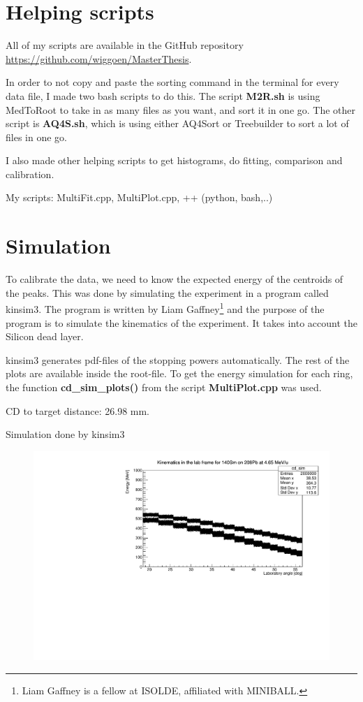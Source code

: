 \documentclass[twoside,english]{uiofysmaster/uiofysmaster}
\begin{document}
\section{Helping scripts}
All of my scripts are available in the GitHub repository \url{https://github.com/wiggoen/MasterThesis}.

In order to not copy and paste the sorting command in the terminal for every data file, I made two bash scripts to do this. The script \textbf{M2R.sh} is using MedToRoot to take in as many files as you want, and sort it in one go. The other script is \textbf{AQ4S.sh}, which is using either AQ4Sort or Treebuilder to sort a lot of files in one go. 

I also made other helping scripts to get histograms, do fitting, comparison and calibration. 

My scripts: MultiFit.cpp, MultiPlot.cpp, ++ (python, bash,..)


\section{Simulation}
To calibrate the data, we need to know the expected energy of the centroids of the peaks. 
This was done by simulating the experiment in a program called kinsim3. The program is written by Liam Gaffney\footnote{Liam Gaffney is a fellow at ISOLDE, affiliated with MINIBALL.} and the purpose of the program is to simulate the kinematics of the experiment. 
It takes into account the Silicon dead layer. 

kinsim3 generates pdf-files of the stopping powers automatically. 
The rest of the plots are available inside the root-file. 
To get the energy simulation for each ring, the function \textbf{cd\_sim\_plots()} from the script \textbf{MultiPlot.cpp} was used. 

\bigskip


CD to target distance: 26.98 mm.


Simulation done by kinsim3

\begin{figure}[H]\centering
    \includegraphics[width=\linewidth]{../Plots/simulation/kin_140Sm_208Pb.pdf}
\end{figure}
\end{document}
